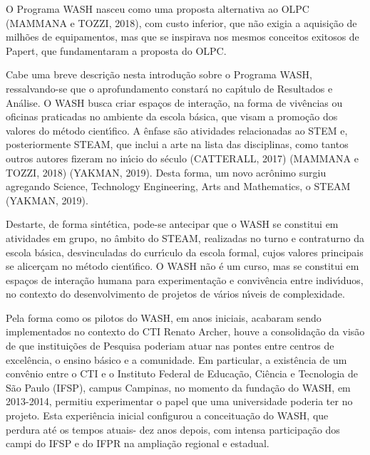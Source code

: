 \documentclass[
12pt,		%
openright,	%
twoside,  %
a4paper,			%
chapter=TITLE,		%
english,			%
french,				%
spanish,			%
brazil				%
]{USPSC-classe/USPSC}
\begin{document}
O Programa WASH nasceu como uma proposta alternativa ao OLPC (MAMMANA e TOZZI, 2018), com custo inferior, que n\~ao exigia a aquisi\c{c}\~ao de milh\~oes de equipamentos, mas que se inspirava nos mesmos conceitos exitosos de Papert, que fundamentaram a proposta do OLPC.








Cabe uma breve descri\c{c}\~ao nesta introdu\c{c}\~ao sobre o Programa WASH, ressalvando-se que o aprofundamento constar\'a no cap\'{\i}tulo de Resultados e An\'alise. O WASH busca criar espa\c{c}os de intera\c{c}\~ao, na forma de  viv\^encias ou oficinas praticadas no ambiente da escola b\'asica, que visam a promo\c{c}\~ao dos valores do m\'etodo cient\'{\i}fico. A \^enfase s\~ao atividades relacionadas ao STEM e, posteriormente STEAM, que inclui a arte na lista das disciplinas, como tantos outros autores fizeram no in\'{\i}cio do s\'eculo  (CATTERALL, 2017) (MAMMANA e TOZZI, 2018)  (YAKMAN, 2019). Desta forma, um novo acr\^onimo surgiu agregando Science, Technology Engineering, Arts and Mathematics, o STEAM  (YAKMAN, 2019).








Destarte, de forma sint\'etica, pode-se antecipar que o WASH se constitui em atividades em grupo, no \^ambito do STEAM, realizadas no turno e contraturno da escola b\'asica, desvinculadas do curr\'{\i}culo da escola formal, cujos valores principais se alicer\c{c}am no m\'etodo cient\'{\i}fico. O WASH n\~ao \'e um curso, mas se constitui em espa\c{c}os de intera\c{c}\~ao humana para experimenta\c{c}\~ao e conviv\^encia entre indiv\'{\i}duos, no contexto do desenvolvimento de projetos de v\'arios n\'{\i}veis de complexidade.








Pela forma como os pilotos do WASH, em anos iniciais, acabaram sendo implementados no contexto do CTI Renato Archer, houve a consolida\c{c}\~ao da vis\~ao de que institui\c{c}\~oes de Pesquisa poderiam atuar nas  pontes entre centros de excel\^encia, o ensino b\'asico e a comunidade. Em particular, a exist\^encia de um conv\^enio entre o CTI e o Instituto Federal de Educa\c{c}\~ao, Ci\^encia e Tecnologia de S\~ao Paulo (IFSP), campus Campinas, no momento da funda\c{c}\~ao do WASH, em 2013-2014, permitiu experimentar o papel que uma universidade poderia ter no projeto. Esta experi\^encia inicial configurou a conceitua\c{c}\~ao do WASH, que perdura at\'e os tempos atuais- dez anos depois, com intensa participa\c{c}\~ao dos campi do IFSP e do IFPR na amplia\c{c}\~ao regional e estadual.
\end{document}
